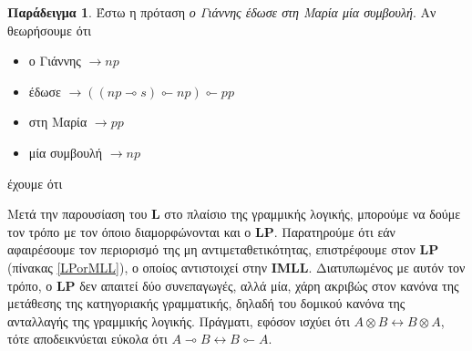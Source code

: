 \documentclass [a4paper,11pt] {book}
\theoremstyle{definition}
\newtheorem{example}[theorem]{Παράδειγμα}
\theoremstyle{definition}
\begin{document}
\begin{example}
Έστω η πρόταση \textit{ο Γιάννης έδωσε στη Μαρία μία συμβουλή}. Αν θεωρήσουμε ότι
\begin{itemize}
\item ο Γιάννης $\to np$ 
\item έδωσε $\to ((np\multimap s)\multimapinv np)\multimapinv pp$
\item στη Μαρία $\to pp$
\item μία συμβουλή $\to np$
\end{itemize}
έχουμε ότι
\begin{prooftree}






\end{prooftree}
\end{example}
Μετά την παρουσίαση του \textbf{L} στο πλαίσιο της γραμμικής λογικής, μπορούμε να δούμε τον τρόπο με τον όποιο διαμορφώνονται και ο \textbf{LP}. Παρατηρούμε ότι εάν αφαιρέσουμε τον περιορισμό της μη αντιμεταθετικότητας, επιστρέφουμε στον \textbf{LP} (πίνακας \ref{LPorMLL}), ο οποίος αντιστοιχεί στην \textbf{IMLL}. Διατυπωμένος με αυτόν τον τρόπο, ο \textbf{LP} δεν απαιτεί δύο συνεπαγωγές, αλλά μία, χάρη ακριβώς στον κανόνα της μετάθεσης της κατηγοριακής γραμματικής, δηλαδή του δομικού κανόνα της ανταλλαγής της γραμμικής λογικής. Πράγματι, εφόσον ισχύει ότι $A \otimes B \leftrightarrow B\otimes A$, τότε αποδεικνύεται εύκολα ότι $A\multimap B \leftrightarrow B\multimapinv A$.
\end{document}
